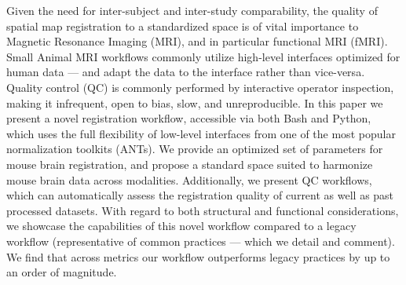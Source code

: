Given the need for inter-subject and inter-study comparability, the quality of spatial map registration to a standardized space is of vital importance to Magnetic Resonance Imaging (MRI), and in particular functional MRI (fMRI).
Small Animal MRI workflows commonly utilize high-level interfaces optimized for human data --- and adapt the data to the interface rather than vice-versa.
Quality control (QC) is commonly performed by interactive operator inspection, making it infrequent, open to bias, slow, and unreproducible.
In this paper we present a novel registration workflow, accessible via both Bash and Python, which uses the full flexibility of low-level interfaces from one of the most popular normalization toolkits (ANTs).
We provide an optimized set of parameters for mouse brain registration, and propose a standard space suited to harmonize mouse brain data across modalities.
Additionally, we present QC workflows, which can automatically assess the registration quality of current as well as past processed datasets.
With regard to both structural and functional considerations, we showcase the capabilities of this novel workflow compared to a legacy workflow (representative of common practices --- which we detail and comment).
We find that across metrics our workflow outperforms legacy practices by up to an order of magnitude.
